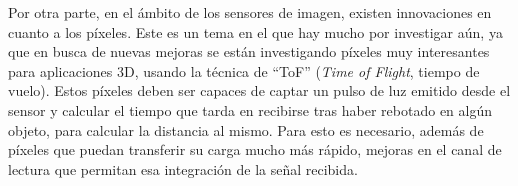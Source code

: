 Por otra parte, en el ámbito de los sensores de imagen, existen innovaciones en
cuanto a los píxeles. Este es un tema en el que hay mucho por investigar aún, ya
que en busca de nuevas mejoras se están investigando píxeles muy interesantes para
aplicaciones 3D, usando la técnica de ``ToF'' (\textit{Time of Flight},
tiempo de vuelo)\cite{Portaluppi2018}\cite{Payne2014}.
Estos píxeles deben ser capaces de captar un pulso de luz emitido desde el sensor
y calcular el tiempo que tarda en recibirse tras haber rebotado en algún objeto,
para calcular la distancia al mismo. Para esto es necesario, además de píxeles
que puedan transferir su carga mucho más rápido, mejoras en el canal de lectura
que permitan esa integración de la señal recibida.\\
